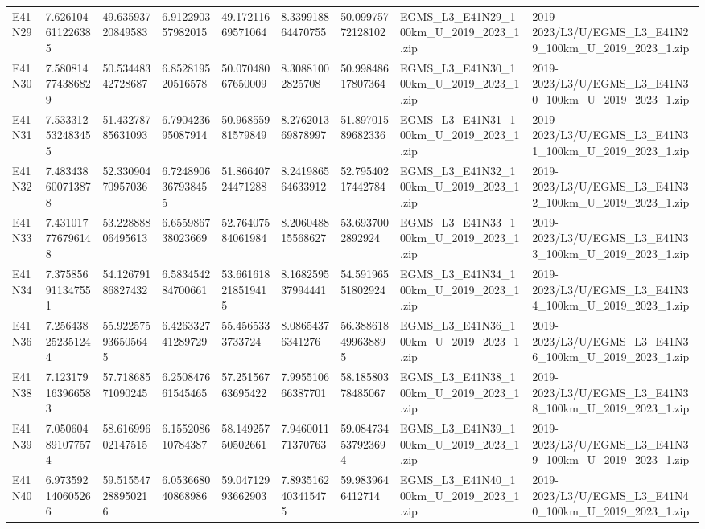 \begin{landscape}
\begin{longtable}{lllllllll}
E41N29 & 7.626104611226385 & 49.63593720849583 & 6.912290357982015 & 49.17211669571064 & 8.339918864470755 & 50.09975772128102 & EGMS\_L3\_E41N29\_100km\_U\_2019\_2023\_1.zip & 2019-2023/L3/U/EGMS\_L3\_E41N29\_100km\_U\_2019\_2023\_1.zip \\
E41N30 & 7.580814774386829 & 50.53448342728687 & 6.852819520516578 & 50.07048067650009 & 8.30881002825708 & 50.99848617807364 & EGMS\_L3\_E41N30\_100km\_U\_2019\_2023\_1.zip & 2019-2023/L3/U/EGMS\_L3\_E41N30\_100km\_U\_2019\_2023\_1.zip \\
E41N31 & 7.533312532483455 & 51.43278785631093 & 6.790423695087914 & 50.96855981579849 & 8.276201369878997 & 51.89701589682336 & EGMS\_L3\_E41N31\_100km\_U\_2019\_2023\_1.zip & 2019-2023/L3/U/EGMS\_L3\_E41N31\_100km\_U\_2019\_2023\_1.zip \\
E41N32 & 7.483438600713878 & 52.33090470957036 & 6.7248906367938455 & 51.86640724471288 & 8.241986564633912 & 52.79540217442784 & EGMS\_L3\_E41N32\_100km\_U\_2019\_2023\_1.zip & 2019-2023/L3/U/EGMS\_L3\_E41N32\_100km\_U\_2019\_2023\_1.zip \\
E41N33 & 7.431017776796148 & 53.22888806495613 & 6.655986738023669 & 52.76407584061984 & 8.206048815568627 & 53.6937002892924 & EGMS\_L3\_E41N33\_100km\_U\_2019\_2023\_1.zip & 2019-2023/L3/U/EGMS\_L3\_E41N33\_100km\_U\_2019\_2023\_1.zip \\
E41N34 & 7.375856911347551 & 54.12679186827432 & 6.583454284700661 & 53.661618218519415 & 8.168259537994441 & 54.59196551802924 & EGMS\_L3\_E41N34\_100km\_U\_2019\_2023\_1.zip & 2019-2023/L3/U/EGMS\_L3\_E41N34\_100km\_U\_2019\_2023\_1.zip \\
E41N36 & 7.256438252351244 & 55.922575936505645 & 6.426332741289729 & 55.4565333733724 & 8.08654376341276 & 56.388618499638895 & EGMS\_L3\_E41N36\_100km\_U\_2019\_2023\_1.zip & 2019-2023/L3/U/EGMS\_L3\_E41N36\_100km\_U\_2019\_2023\_1.zip \\
E41N38 & 7.123179163966583 & 57.71868571090245 & 6.250847661545465 & 57.25156763695422 & 7.995510666387701 & 58.18580378485067 & EGMS\_L3\_E41N38\_100km\_U\_2019\_2023\_1.zip & 2019-2023/L3/U/EGMS\_L3\_E41N38\_100km\_U\_2019\_2023\_1.zip \\
E41N39 & 7.050604891077574 & 58.61699602147515 & 6.155208610784387 & 58.14925750502661 & 7.946001171370763 & 59.084734537923694 & EGMS\_L3\_E41N39\_100km\_U\_2019\_2023\_1.zip & 2019-2023/L3/U/EGMS\_L3\_E41N39\_100km\_U\_2019\_2023\_1.zip \\
E41N40 & 6.973592140605266 & 59.515547288950216 & 6.053668040868986 & 59.04712993662903 & 7.8935162403415475 & 59.9839646412714 & EGMS\_L3\_E41N40\_100km\_U\_2019\_2023\_1.zip & 2019-2023/L3/U/EGMS\_L3\_E41N40\_100km\_U\_2019\_2023\_1.zip \\

\end{longtable}
\end{landscape}
